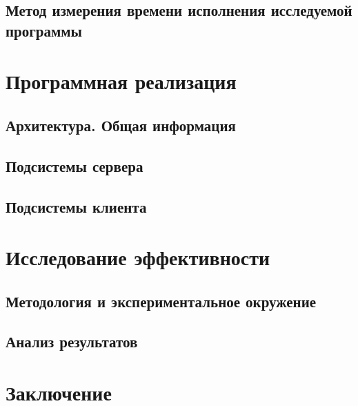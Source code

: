 \documentclass{disser}
\begin{document}





\subsection{Метод измерения времени исполнения исследуемой программы}



\section{Программная реализация}
\subsection{Архитектура. Общая информация}

\subsection{Подсистемы сервера}

\subsection{Подсистемы клиента}

\section{Исследование эффективности}
\subsection{Методология и экспериментальное окружение}

\subsection{Анализ результатов}

\section*{Заключение}
\end{document}
